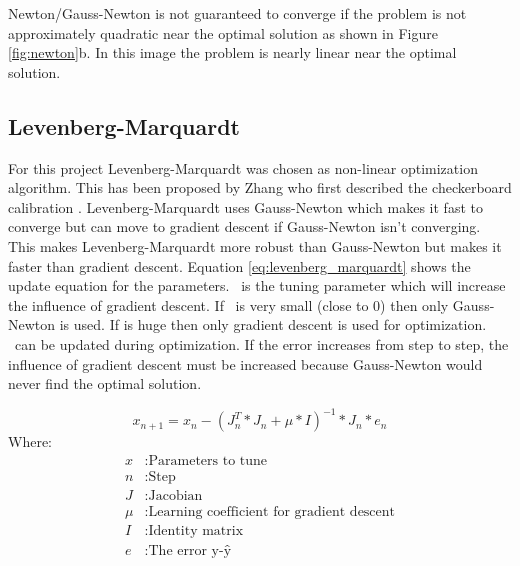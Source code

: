 \documentclass[11pt,a4paper,titlepage,oneside]{report}
\begin{document}
Newton/Gauss-Newton is not guaranteed to converge if the problem is not approximately quadratic near the optimal solution as shown in Figure \ref{fig:newton}b. In this image the problem is nearly linear near the optimal solution.

\subsection{Levenberg-Marquardt}
For this project Levenberg-Marquardt was chosen as non-linear optimization algorithm. This has been proposed by Zhang who first described the checkerboard calibration \cite{Zhang}. Levenberg-Marquardt uses Gauss-Newton which makes it fast to converge but can move to gradient descent if Gauss-Newton isn't converging. This makes Levenberg-Marquardt more robust than Gauss-Newton but makes it faster than gradient descent. Equation \ref{eq:levenberg_marquardt} shows the update equation for the parameters. \mu\ is the tuning parameter which will increase the influence of gradient descent. If \mu\ is very small (close to 0) then only Gauss-Newton is used. If \mu is huge then only gradient descent is used for optimization. \mu\ can be updated during optimization. If the error increases from step to step, the influence of gradient descent must be increased because Gauss-Newton would never find the optimal solution.

\begin{equation}\label{eq:levenberg_marquardt}
  x_{n+1} = x_n - (J_n^T*J_n + \mu*I)^{-1}*J_n*e_n
\end{equation}
Where:
\begin{align*}
  x		  &: \text{Parameters to tune}\\
  n		  &: \text{Step}\\
  J		  &: \text{Jacobian}\\
  \mu	  &: \text{Learning coefficient for gradient descent}\\
  I     &: \text{Identity matrix}\\
  e  	  &: \text{The error y-ŷ}
\end{align*}
\end{document}
